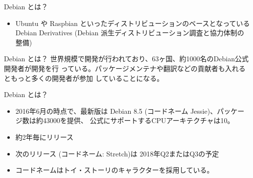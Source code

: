 \begin{frame}{Debian とは？}

\begin{minipage}{0.45\hsize}
  \begin{itemize}
\item Ubuntu や Raspbian といったディストリビューションのベースとなっている \\
	Debian Derivatives (Debian 派生ディストリビューション調査と協力体制の整備)
  \end{itemize}
\end{minipage} 
\begin{minipage}{0.45\hsize}
 \begin{center} 
 \end{center}
\end{minipage}

\end{frame}

\begin{frame}{Debian とは？}
 世界規模で開発が行われており、63ヶ国、約1000名のDebian公式開発者が開発を行
 っている。パッケージメンテナや翻訳などの貢献者も入れるともっと多くの開発者が参加
 していることになる。
\end{frame}

\begin{frame}{Debian とは？}
\begin{itemize}[<+->]
 \item 2016年6月の時点で、\pause 最新版は Debian 8.5 (コードネーム Jessie)、\pause パッケージ数は約43000を提供、\pause
 公式にサポートするCPUアーキテクチャは10。\pause
 \item 約2年毎にリリース
 \begin{center}
 \end{center}
 \item 次のリリース (コードネーム: Stretch)は 2018年Q2またはQ3の予定
 \item コードネームはトイ・ストーリのキャラクターを採用している。
\end{itemize}
\end{frame}


